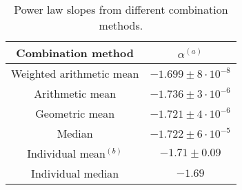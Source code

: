 \begin{table}
\centering
\begin{center}
\caption{Power law slopes from different combination methods.}

\begin{tabular}{cc}
\hline
\noalign{\smallskip}
Combination method &  $\alpha$$^{(a)}$ \\  
\hline


Weighted arithmetic mean  & $-1.699\pm 8 \cdot 10^{-8}$   \\
Arithmetic mean  & $-1.736\pm 3 \cdot 10^{-6}$   \\
Geometric mean  & $-1.721\pm 4 \cdot 10^{-6}$   \\
Median  & $-1.722\pm 6 \cdot 10^{-5}$   \\

Individual mean$^{(b)}$  & $-1.71\pm 0.09$   \\
Individual median & $-1.69$   \\
\hline
\hline
\end{tabular}
\end{center}


\end{table}



